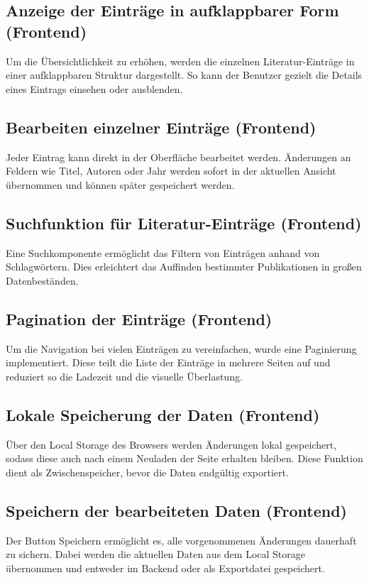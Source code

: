 \subsection{Anzeige der Einträge in aufklappbarer Form (Frontend)}
Um die Übersichtlichkeit zu erhöhen, werden die einzelnen Literatur-Einträge in 
einer aufklappbaren Struktur dargestellt. So kann der Benutzer gezielt die Details
eines Eintrags einsehen oder ausblenden.

\subsection{Bearbeiten einzelner Einträge (Frontend)}
Jeder Eintrag kann direkt in der Oberfläche bearbeitet werden.
Änderungen an Feldern wie Titel, Autoren oder Jahr werden sofort in der aktuellen Ansicht
übernommen und können später gespeichert werden.

\subsection{Suchfunktion für Literatur-Einträge (Frontend)}
Eine Suchkomponente ermöglicht das Filtern von Einträgen anhand von Schlagwörtern.
Dies erleichtert das Auffinden bestimmter Publikationen in großen Datenbeständen.

\subsection{Pagination der Einträge (Frontend)}
Um die Navigation bei vielen Einträgen zu vereinfachen, 
wurde eine Paginierung implementiert. Diese teilt die Liste der Einträge in
mehrere Seiten auf und reduziert so die Ladezeit und die visuelle Überlastung.

\subsection{Lokale Speicherung der Daten (Frontend)}
Über den Local Storage des Browsers werden Änderungen lokal gespeichert, sodass diese auch nach 
einem Neuladen der Seite erhalten bleiben. Diese Funktion dient als Zwischenspeicher, 
bevor die Daten endgültig exportiert.

\subsection{Speichern der bearbeiteten Daten (Frontend)}
Der Button \glqq Speichern\grqq{} ermöglicht es, alle vorgenommenen Änderungen dauerhaft zu sichern.
Dabei werden die aktuellen Daten aus dem Local Storage übernommen und entweder im Backend oder als Exportdatei gespeichert.


